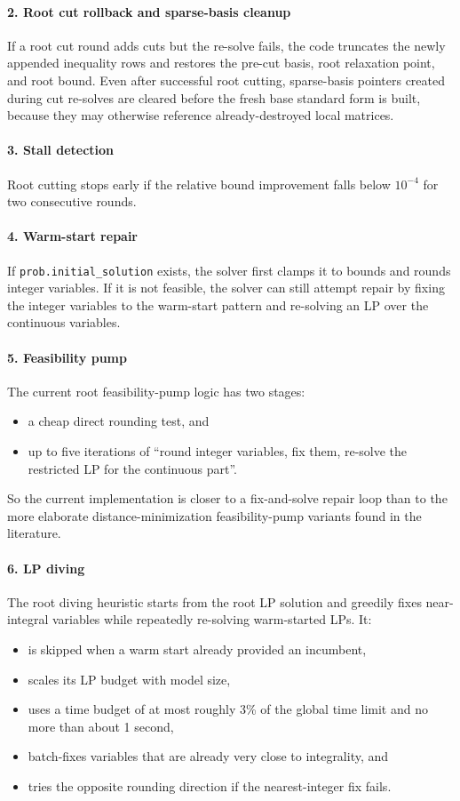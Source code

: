 \paragraph{2. Root cut rollback and sparse-basis cleanup}
If a root cut round adds cuts but the re-solve fails, the code truncates the newly appended inequality rows and restores the pre-cut basis, root relaxation point, and root bound. Even after successful root cutting, sparse-basis pointers created during cut re-solves are cleared before the fresh base standard form is built, because they may otherwise reference already-destroyed local matrices.

\paragraph{3. Stall detection}
Root cutting stops early if the relative bound improvement falls below \(10^{-4}\) for two consecutive rounds.

\paragraph{4. Warm-start repair}
If \texttt{prob.initial\_solution} exists, the solver first clamps it to bounds and rounds integer variables. If it is not feasible, the solver can still attempt repair by fixing the integer variables to the warm-start pattern and re-solving an LP over the continuous variables.

\paragraph{5. Feasibility pump}
The current root feasibility-pump logic has two stages:
\begin{itemize}
  \item a cheap direct rounding test, and
  \item up to five iterations of ``round integer variables, fix them, re-solve the restricted LP for the continuous part''.
\end{itemize}
So the current implementation is closer to a fix-and-solve repair loop than to the more elaborate distance-minimization feasibility-pump variants found in the literature.

\paragraph{6. LP diving}
The root diving heuristic starts from the root LP solution and greedily fixes near-integral variables while repeatedly re-solving warm-started LPs. It:
\begin{itemize}
  \item is skipped when a warm start already provided an incumbent,
  \item scales its LP budget with model size,
  \item uses a time budget of at most roughly 3\% of the global time limit and no more than about 1 second,
  \item batch-fixes variables that are already very close to integrality, and
  \item tries the opposite rounding direction if the nearest-integer fix fails.
\end{itemize}

